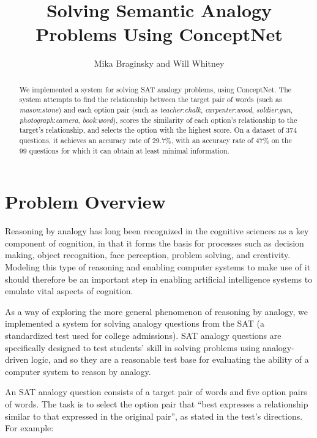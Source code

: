 \documentclass[11pt]{article}
\begin{document}
\title{Solving Semantic Analogy Problems Using ConceptNet}
\author{Mika Braginsky and Will Whitney}
\maketitle

\begin{abstract}
We implemented a system for solving SAT analogy problems, using ConceptNet. The system attempts to find the relationship between the target pair of words (such as \emph{mason}:\emph{stone}) and each option pair (such as \emph{teacher}:\emph{chalk}, \emph{carpenter}:\emph{wood}, \emph{soldier}:\emph{gun}, \emph{photograph}:\emph{camera}, \emph{book}:\emph{word}), scores the similarity of each option's relationship to the target's relationship, and selects the option with the highest score. On a dataset of 374 questions, it achieves an accuracy rate of 29.7\%, with an accuracy rate of 47\% on the 99 questions for which it can obtain at least minimal information.
\end{abstract}

\section{Problem Overview}

Reasoning by analogy has long been recognized in the cognitive sciences as a key component of cognition, in that it forms the basis for processes such as decision making, object recognition, face perception, problem solving, and creativity. Modeling this type of reasoning and enabling computer systems to make use of it should therefore be an important step in enabling artificial intelligence systems to emulate vital aspects of cognition.

As a way of exploring the more general phenomenon of reasoning by analogy, we implemented a system for solving analogy questions from the SAT (a standardized test used for college admissions). SAT analogy questions are specifically designed to test students' skill in solving problems using analogy-driven logic, and so they are a reasonable test base for evaluating the ability of a computer system to reason by analogy.

An SAT analogy question consists of a target pair of words and five option pairs of words. The task is to select the option pair that ``best expresses a relationship similar to that expressed in the original pair'', as stated in the test's directions. For example:
\end{document}
